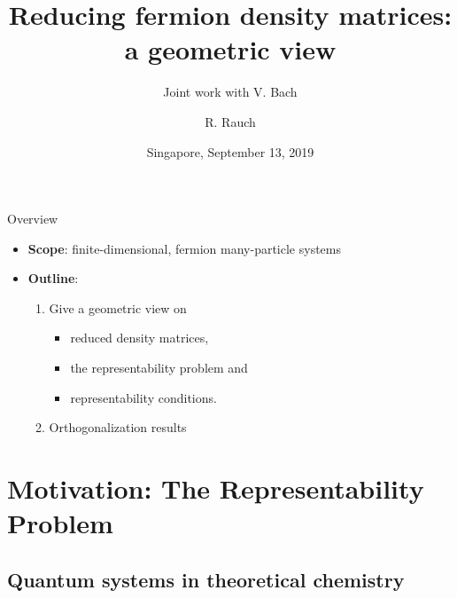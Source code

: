 \documentclass{beamer}
\title{Reducing fermion density matrices: a geometric view}
\subtitle{\hfill Joint work with V. Bach}
\author{R. Rauch}
\date{Singapore, September 13, 2019}
\begin{document}
\begin{frame}[plain]
\titlepage
\end{frame}

\begin{frame}{Overview}
  \begin{itemize}
    \item \textbf{Scope}: finite-dimensional, fermion many-particle systems
    \item \textbf{Outline}:
      \begin{enumerate}
        \item Give a geometric view on
          \begin{itemize}
            \item reduced density matrices,
            \item the representability problem and
            \item representability conditions.
          \end{itemize}
        \item Orthogonalization results \parencite{Bach2019}
      \end{enumerate}
  \end{itemize}
\end{frame}

\section{Motivation: The Representability Problem}
\subsection{Quantum systems in theoretical chemistry}
\frame{\sectionpage}
\end{document}
